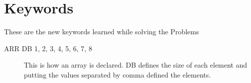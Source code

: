 \documentclass[12pt]{article}
\begin{document}





\pagebreak
\section*{Keywords}
These are the new keywords learned while solving the Problems
\begin{description}
    \item [ARR DB 1, 2, 3, 4, 5, 6, 7, 8] This is how an array is declared. DB defines the size of each element and putting the values separated by comma defined the elements.
\end{description}
\end{document}
